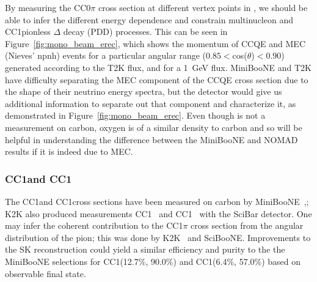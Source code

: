By measuring the CC0$\pi$ cross section  at different vertex points in \nuprismlite, we should be able to infer the different energy dependence and constrain multinucleon and CC1\pip pionless $\Delta$ decay (PDD)  processes. This can be seen in Figure~\ref{fig:mono_beam_erec}, which shows the momentum of CCQE and MEC (Nieves' npnh) events for a particular angular range ($0.85<$cos($\theta$)$<0.90$) generated according to the T2K flux, and for a 1~GeV \nuprismlite flux. MiniBooNE and T2K have difficulty separating the MEC component of the CCQE cross section due to the shape of their neutrino energy spectra, but the \nuprismlite detector would give us additional information to separate out that component and characterize it, as demonstrated in Figure~\ref{fig:mono_beam_erec}.  Even though \nuprismlite is not a measurement on carbon, oxygen is of a similar density to carbon and so will be helpful in understanding the difference between the MiniBooNE and NOMAD results if it is indeed due to MEC.


\subsubsection{CC1\pip and CC1\piz}

The CC1\pip and CC1\piz cross sections have been measured on carbon by MiniBooNE~\cite{AguilarArevalo:2010bm},\cite{AguilarArevalo:2010xt}; K2K also produced measurements CC1\pip~\cite{Rodriguez:2008aa} and CC1\piz~\cite{Mariani:2010ez} with the SciBar detector. One may infer the coherent contribution to the CC1$\pi$ cross section from the angular distribution of the pion; this was done by K2K~\cite{Hasegawa:2005td} and SciBooNE. Improvements to the SK reconstruction could yield a similar efficiency and purity to the the MiniBooNE selections for CC1\pip (12.7\%, 90.0\%) and CC1\piz (6.4\%, 57.0\%) based on observable final state.

